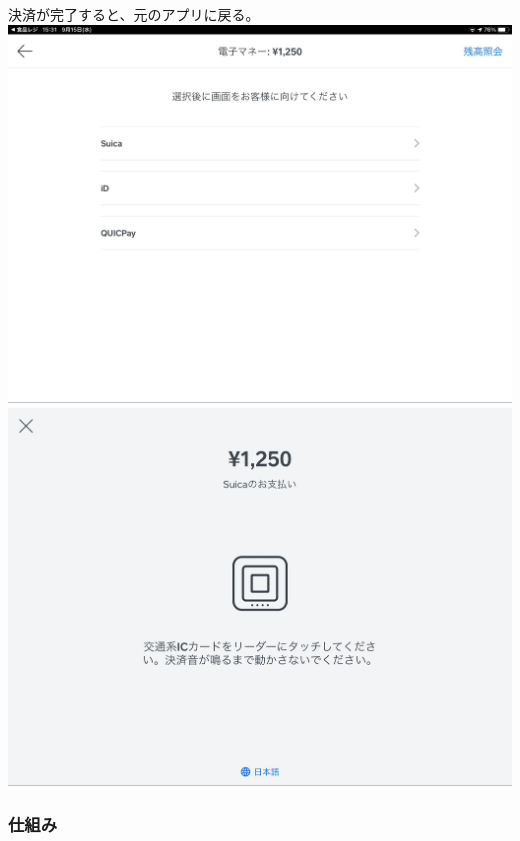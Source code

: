 \documentclass[dvipdfmx,jb5]{jreport}
\begin{document}
\begin{enumerate}
\begin{enumerate}
\begin{enumerate}
                                    決済が完了すると、元のアプリに戻る。\\
                                    \includegraphics[scale=0.2]{assets/square_e-payment_selection.jpg}\\
                                    \includegraphics[scale=0.2]{assets/square_e-payment_scan.jpg}
                        \end{enumerate}
            \end{enumerate}
\end{enumerate}
\subsubsection{仕組み}
\end{document}
